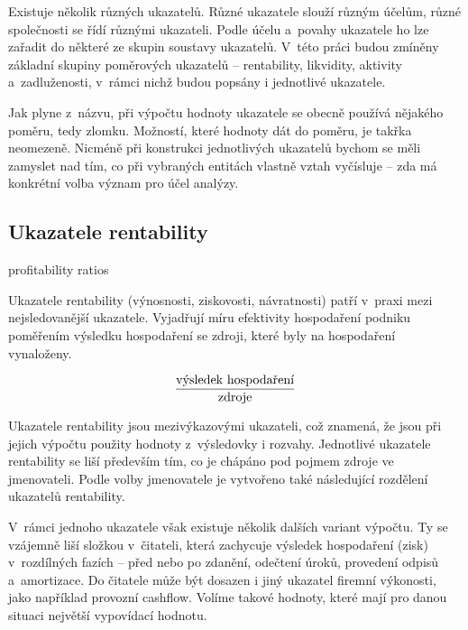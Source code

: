 Existuje několik různých ukazatelů. Různé ukazatele slouží různým účelům, různé společnosti se řídí různými ukazateli. Podle účelu a~povahy ukazatele ho lze zařadit do některé ze skupin soustavy ukazatelů. V~této práci budou zmíněny základní skupiny poměrových ukazatelů -- rentability, likvidity, aktivity a~zadluženosti, v~rámci nichž budou popsány i jednotlivé ukazatele.

Jak plyne z~názvu, při výpočtu hodnoty ukazatele se obecně používá nějakého poměru, tedy zlomku. Možností, které hodnoty dát do poměru, je takřka neomezeně. Nicméně při konstrukci jednotlivých ukazatelů bychom se měli zamyslet nad tím, co při vybraných entitách vlastně vztah vyčísluje -- zda má konkrétní volba význam pro účel analýzy.\cite{kisling}

\subsection{Ukazatele rentability}
profitability ratios

Ukazatele rentability (výnosnosti, ziskovosti, návratnosti) patří v~praxi mezi nejsledovanější ukazatele. Vyjadřují míru efektivity hospodaření podniku poměřením výsledku hospodaření se zdroji, které byly na hospodaření vynaloženy.

$$\dfrac{\text{výsledek hospodaření}}{\text{zdroje}}$$

Ukazatele rentability jsou mezivýkazovými ukazateli, což znamená, že jsou při jejich výpočtu použity hodnoty z~výsledovky i rozvahy. Jednotlivé ukazatele rentability se liší především tím, co je chápáno pod pojmem zdroje ve jmenovateli.\cite{mendelu} Podle volby jmenovatele je vytvořeno také následující rozdělení ukazatelů rentability. 

V~rámci jednoho ukazatele však existuje několik dalších variant výpočtu. Ty se vzájemně liší složkou v~čitateli, která zachycuje výsledek hospodaření (zisk) v~rozdílných fazích -- před nebo po zdanění, odečtení úroků, provedení odpisů a~amortizace. Do čitatele může být dosazen i jiný ukazatel firemní výkonosti, jako například provozní cashflow. Volíme takové hodnoty, které mají pro danou situaci největší vypovídací hodnotu.

